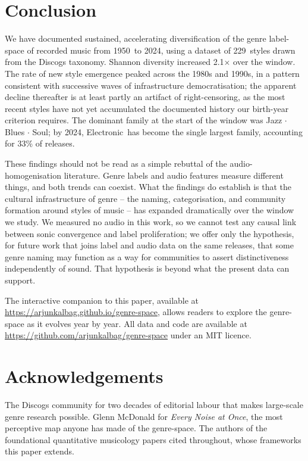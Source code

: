 \documentclass[12pt, a4paper]{article}
\newcommand{\gsYearMin}{1950}%
\newcommand{\gsYearMax}{2024}%
\newcommand{\gsNStyles}{229}%
\newcommand{\gsShannonGrowth}{2.1}%
\newcommand{\gsTopFamFirst}{Jazz $\cdot$ Blues $\cdot$ Soul}%
\newcommand{\gsTopFamLast}{Electronic}%
\newcommand{\gsTopFamLastShare}{33}}
\begin{document}
\section{Conclusion}
\label{sec:conclusion}

We have documented sustained, accelerating diversification of the genre
label-space of recorded music from \gsYearMin\ to \gsYearMax,
using a dataset of \gsNStyles\ styles drawn from the Discogs taxonomy.
Shannon diversity increased \gsShannonGrowth$\times$ over the window.
The rate of new style emergence peaked across the 1980s and 1990s,
in a pattern consistent with successive waves of infrastructure
democratisation; the apparent decline thereafter is at least partly an
artifact of right-censoring, as the most recent styles have not yet
accumulated the documented history our birth-year criterion requires.
The dominant family at the start of the window was \gsTopFamFirst;
by \gsYearMax, \gsTopFamLast\ has become the single largest family,
accounting for \gsTopFamLastShare\% of releases.

These findings should not be read as a simple rebuttal of the
audio-homogenisation literature. Genre labels and audio features measure
different things, and both trends can coexist. What the findings do
establish is that the cultural infrastructure of genre -- the naming,
categorisation, and community formation around styles of music -- has
expanded dramatically over the window we study. We measured no audio in
this work, so we cannot test any causal link between sonic convergence and
label proliferation; we offer only the hypothesis, for future work that
joins label and audio data on the same releases, that some genre naming may
function as a way for communities to assert distinctiveness independently of
sound. That hypothesis is beyond what the present data can support.

The interactive companion to this paper, available at
\url{https://arjunkalbag.github.io/genre-space}, allows readers to explore
the genre-space as it evolves year by year.
All data and code are available at
\url{https://github.com/arjunkalbag/genre-space} under an MIT licence.

\section*{Acknowledgements}

The Discogs community for two decades of editorial labour that makes
large-scale genre research possible. Glenn McDonald for
\emph{Every Noise at Once}, the most perceptive map anyone has made
of the genre-space. The authors of the foundational quantitative musicology
papers cited throughout, whose frameworks this paper extends.
\end{document}
